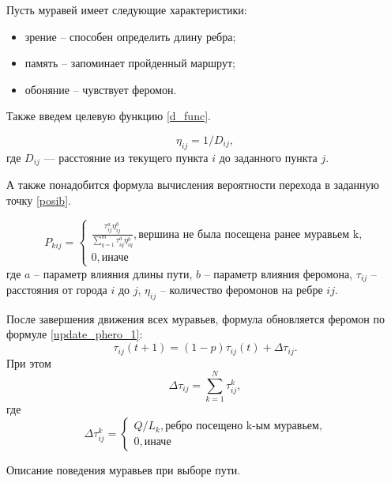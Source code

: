 Пусть муравей имеет следующие характеристики:
\begin{itemize}
	\item зрение -- способен определить длину ребра;
	\item память -- запоминает пройденный маршрут;
	\item обоняние -- чувствует феромон.
\end{itemize}


Также введем целевую функцию \eqref{d_func}.

\begin{equation}
	\label{d_func}
	\eta_{ij} = 1 / D_{ij},
\end{equation}
где $D_{ij}$ — расстояние из текущего пункта $i$ до заданного пункта $j$.


А также понадобится формула вычисления вероятности перехода в заданную точку \eqref{posib}.

\begin{equation}
	\label{posib}
	P_{kij} = \begin{cases}
		\frac{\tau_{ij}^a\eta_{ij}^b}{\sum_{q=1}^m \tau^a_{iq}\eta^b_{iq}}, \textrm{вершина не была посещена ранее муравьем k,} \\
		0, \textrm{иначе}
	\end{cases}
\end{equation}
где $a$ -- параметр влияния длины пути, $b$ -- параметр влияния феромона, $\tau_{ij}$ -- расстояния от города $i$ до $j$, $\eta_{ij}$ -- количество феромонов на ребре $ij$.

После завершения движения всех муравьев, формула обновляется феромон по формуле \eqref{update_phero_1}:
\begin{equation}
	\label{update_phero_1}
		\tau_{ij}(t+1) = (1-p)\tau_{ij}(t) + \Delta \tau_{ij}.
\end{equation}
При этом
\begin{equation}
\label{update_phero_2}
 \Delta \tau_{ij} = \sum_{k=1}^N \tau^k_{ij},
\end{equation}
где
\begin{equation}
	\label{update_phero_3}
		 \Delta\tau^k_{ij} = \begin{cases}
		Q/L_{k}, \textrm{ребро посещено k-ым муравьем,} \\
		0, \textrm{иначе}
	\end{cases}
\end{equation}


Описание поведения муравьев при выборе пути.

